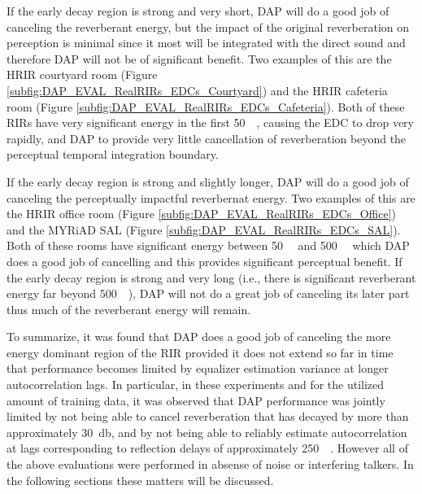 If the early decay region is strong and very short, DAP will do a good job of canceling the reverberant energy, but the impact of the original reverberation on perception is minimal since it most will be integrated with the direct sound and therefore DAP will not be of significant benefit. Two examples of this are the HRIR courtyard room (Figure \ref{subfig:DAP_EVAL_RealRIRs_EDCs_Courtyard}) and the HRIR cafeteria room (Figure \ref{subfig:DAP_EVAL_RealRIRs_EDCs_Cafeteria}). Both of these RIRs have very significant energy in the first \qty{50}{\milli\sec}, causing the EDC to drop very rapidly, and DAP to provide very little cancellation of reverberation beyond the perceptual temporal integration boundary.

If the early decay region is strong and slightly longer, DAP will do a good job of canceling the perceptually impactful reverbernat energy. Two examples of this are the HRIR office room (Figure \ref{subfig:DAP_EVAL_RealRIRs_EDCs_Office}) and the MYRiAD SAL  (Figure \ref{subfig:DAP_EVAL_RealRIRs_EDCs_SAL}). Both of these rooms have significant energy between \qty{50}{\milli\sec} and \qty{500}{\milli\sec} which DAP does a good job of cancelling and this provides significant perceptual benefit. If the early decay region is strong and very long (i.e., there is significant reverberant energy far beyond \qty{500}{\milli\sec}), DAP will not do a great job of canceling its later part thus much of the reverberant energy will remain.

To summarize, it was found that DAP does a good job of canceling the more energy dominant region of the RIR provided it does not extend so far in time that performance becomes limited by equalizer estimation variance at longer autocorrelation lags. In particular, in these experiments and for the utilized amount of training data, it was observed that DAP performance was jointly limited by not being able to cancel reverberation that has decayed by more than approximately \qty{30}{\decibel}, and by not being able to reliably estimate autocorrelation at lags corresponding to reflection delays of approximately \qty{250}{\milli\sec}. However all of the above evaluations were performed in absense of noise or interfering talkers. In the following sections these matters will be discussed.



